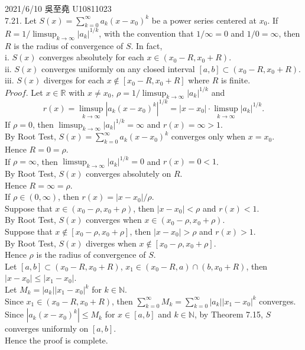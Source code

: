 \documentclass[12pt]{book}
\author{andersonwu2000}
\begin{document}
\begin{CJK}{UTF8}{bsmi}

\hfill 2021/6/10 吳至堯 U10811023 \\

7.21. Let $S(x) = \sum_{k=0}^\infty a_k(x-x_0)^k$ be a power series centered at $x_0$. If $R = 1/\limsup_{k\rightarrow\infty} |a_k|^{1/k}$, with the convention that $1/\infty = 0$ and $1/0 = \infty$, then $R$ is the radius of convergence of $S$. In fact, \\
i. $S(x)$ converges absolutely for each $x\in(x_0-R, x_0+R)$. \\
ii. $S(x)$ converges uniformly on any closed interval $[a, b] \subset(x_0-R, x_0+R)$. \\
iii. $S(x)$ diverges for each $x\not\in[x_0-R, x_0+R]$ where $R$ is finite. \\
$Proof$. Let $x\in\mathbb{R}$ with $x\ne x_0$, $\rho = 1/\limsup_{k\rightarrow\infty} |a_k|^{1/k}$ and 
\[
    r(x) 
    = \limsup_{k\rightarrow\infty} |a_k(x-x_0)^k|^{1/k} 
    = |x-x_0|\cdot\limsup_{k\rightarrow\infty} |a_k|^{1/k}.
\]
If $\rho = 0$, then $\limsup_{k\rightarrow\infty} |a_k|^{1/k} = \infty$ and $r(x) = \infty > 1$. \\
By Root Test, $S(x) = \sum_{k=0}^\infty a_k(x-x_0)^k$ converges only when $x=x_0$. \\
Hence $R = 0 = \rho$. \\
If $\rho = \infty$, then $\limsup_{k\rightarrow\infty} |a_k|^{1/k} = 0$ and $r(x) = 0 < 1$. \\
By Root Test, $S(x)$ converges absolutely on $R$. \\
Hence $R = \infty = \rho$. \\
If $\rho\in(0, \infty)$, then $r(x)=|x-x_0|/\rho$. \\
Suppose that $x\in(x_0-\rho, x_0+\rho)$, then $|x-x_0| < \rho$ and $r(x)<1$. \\
By Root Test, $S(x)$ converges when $x\in(x_0-\rho, x_0+\rho)$. \\
Suppose that $x\not\in[x_0-\rho, x_0+\rho]$, then $|x-x_0| > \rho$ and $r(x)>1$. \\
By Root Test, $S(x)$ diverges when $x\not\in[x_0-\rho, x_0+\rho]$. \\
Hence $\rho$ is the radius of convergence of $S$. \\
Let $[a, b]\subset(x_0-R, x_0+R)$, $x_1\in(x_0-R, a)\cap(b, x_0+R)$, then $|x-x_0| \le |x_1-x_0|$. \\
Let $M_k = |a_k||x_1-x_0|^k$ for $k\in\mathbb{N}$. \\
Since $x_1\in(x_0-R, x_0+R)$, then $\sum_{k=0}^\infty M_k = \sum_{k=0}^\infty |a_k||x_1-x_0|^k$ converges. \\
Since $|a_k(x-x_0)^k|\le M_k$ for $x\in[a, b]$ and $k\in\mathbb{N}$, by Theorem 7.15, $S$ converges uniformly on $[a, b]$. \\
Hence the proof is complete. \\


\end{CJK}
\end{document}
